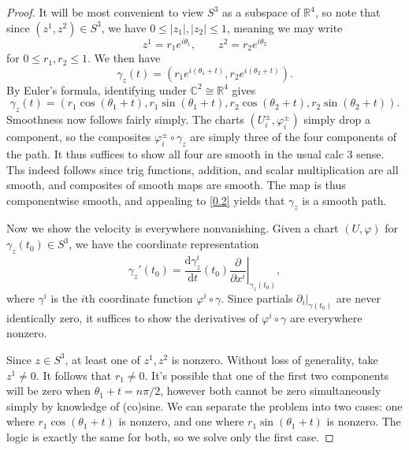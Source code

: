 \documentclass[11pt, letterpaper]{article}
\theoremstyle{plain}
\begin{document}
\begin{proof}
	It will be most convenient to view $S^3$ as a subspace of $\mathbb{R} ^4$, so note that since $(z^1,z^2)\in S^3$, we have $0\leq \left| z_1\right|,\left|z_2 \right| \leq 1$, meaning we may write
	\[
		z^1=r_1e^{i\theta _1} ,\qquad z^2=r_2e^{i\theta _2} 
	\]
	for $0\leq r_1,r_2\leq 1$. We then have
	\[
		\gamma _z(t)=\left( r_1e^{i(\theta _1+t)} ,r_2e^{i(\theta _2+t)}  \right) 
	.\]
	By Euler's formula, identifying under $\mathbb{C} ^2 \cong \mathbb{R} ^4$ gives
	\[
		\gamma_z(t) = \left( r_1 \cos (\theta _1+t),r_1 \sin (\theta _1+t),r_2 \cos (\theta _2+t),r_2 \sin (\theta _2+t) \right) 
	.\]
	Smoothness now follows fairly simply. The charts $(U^{\pm}_i,\varphi ^{\pm} _i)$ simply drop a component, so the composites $\varphi ^{\pm}_i \circ \gamma _z$ are simply three of the four components of the path. It thus suffices to show all four are smooth in the usual calc 3 sense. Ths indeed follows since trig functions, addition, and scalar multiplication are all smooth, and composites of smooth maps are smooth. The map is thus componentwise smooth, and appealing to \cref{0.2} yields that $\gamma _z$ is a smooth path.

	Now we show the velocity is everywhere nonvanishing. Given a chart $(U,\varphi )$ for $\gamma_z(t_0)\in S^3$, we have the coordinate representation
	\[
		\gamma_z'(t_0)=\frac{\mathrm{d}\gamma_z^i}{\mathrm{d}t} (t_0)\left. \frac{\partial }{\partial x^i} \right|_{\gamma_z (t_0)} ,
	\]
	where $\gamma ^i$ is the $i$th coordinate function $\varphi ^i \circ \gamma $. Since partials $\partial _i|_{\gamma (t_0)} $ are never identically zero, it suffices to show the derivatives of $\varphi^i \circ \gamma $ are everywhere nonzero.

	Since $z\in S^3$, at least one of $z^1,z^2$ is nonzero. Without loss of generality, take $z^1 \neq 0$. It follows that $r_1 \neq 0$. It's possible that one of the first two components will be zero when $\theta _1+t=n\pi /2$, however both cannot be zero simultaneously simply by knowledge of (co)sine. We can separate the problem into two cases: one where $r_1 \cos (\theta _1+t)$ is nonzero, and one where $r_1 \sin (\theta _1+t)$ is nonzero. The logic is exactly the same for both, so we solve only the first case.


\end{proof}
\end{document}
